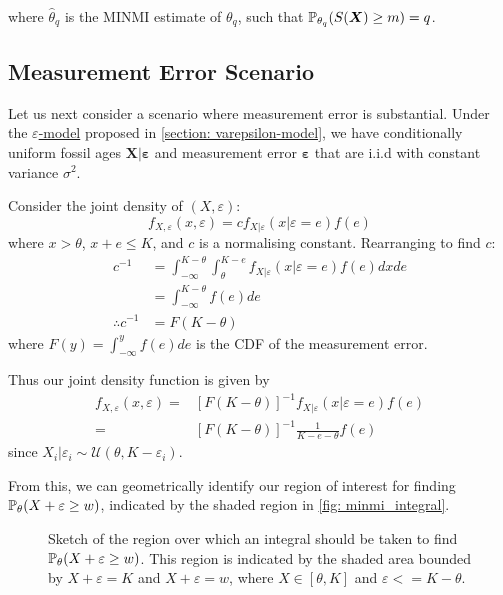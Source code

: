 where $\hat\theta_q$ is the MINMI estimate of $\theta_q$, such that $\mathbb{P}_{\theta_q} (S(\bm{X}) \geq m) = q$.

\subsection{Measurement Error Scenario}

Let us next consider a scenario where measurement error is substantial. Under the \hyperref[model: measurement-error]{$\varepsilon$-model} proposed in \autoref{section: varepsilon-model}, we have conditionally uniform fossil ages $\bm{X|\varepsilon}$ and measurement error $\bm{\varepsilon}$ that are i.i.d with constant variance $\sigma^2$.

Consider the joint density of $(X, \varepsilon)$:
\[
    f_{X, \varepsilon} ( x , \varepsilon) = c f_{X | \varepsilon} ( x | \varepsilon=e) f(e)
\] where $x > \theta$, $x+e \leq K$, and $c$ is a normalising constant. Rearranging to find $c$:
\begin{align*}
    c^{-1}
        &= \int_{-\infty}^{K-\theta} \int_{\theta}^{K-e} f_{X | \varepsilon} ( x | \varepsilon=e) f(e) dx de\\
        &= \int_{-\infty}^{K-\theta} f(e) de \\
    \therefore c^{-1} &= F(K - \theta)
\end{align*}
where $F(y)=\int_{-\infty}^{y} f(e) de$ is the CDF of the measurement error.

Thus our joint density function is given by
\begin{align*}
    f_{X, \varepsilon} ( x , \varepsilon)
        =& [F(K - \theta)]^{-1} f_{X | \varepsilon} ( x | \varepsilon=e) f(e) \\
        =& [F(K - \theta)]^{-1} \frac{1}{K - e - \theta} f(e)
\end{align*}
since $X_i | \varepsilon_i \sim \mathcal{U}(\theta, K-\varepsilon_i)$. 

From this, we can geometrically identify our region of interest for finding $\mathbb{P}_\theta ( X + \varepsilon \geq w)$, indicated by the shaded region in \autoref{fig: minmi_integral}.
\begin{figure}[ht]
    \centering
    
    \vspace{-10mm}
    \caption{Sketch of the region over which an integral should be taken to find $\mathbb{P}_\theta ( X + \varepsilon \geq w)$. This region is indicated by the shaded area bounded by  $X+\varepsilon = K$ and $X + \varepsilon = w$, where $X \in [\theta, K]$ and $\varepsilon <= K-\theta$.}
    \label{fig: minmi_integral}
\end{figure}

